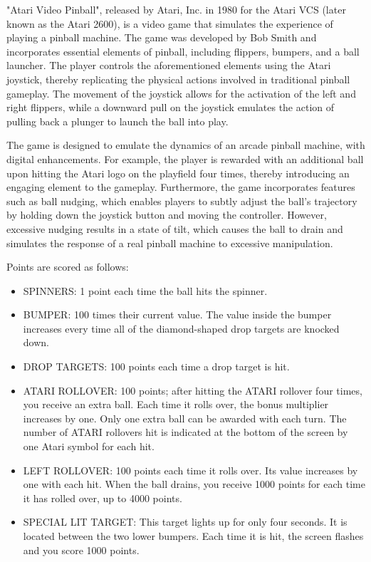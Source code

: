 "Atari Video Pinball", released by Atari, Inc. in 1980 for the Atari VCS (later known as the Atari 2600), is a video game that simulates the experience of playing a pinball machine. The game was developed by Bob Smith and incorporates essential elements of pinball, including flippers, bumpers, and a ball launcher. The player controls the aforementioned elements using the Atari joystick, thereby replicating the physical actions involved in traditional pinball gameplay. The movement of the joystick allows for the activation of the left and right flippers, while a downward pull on the joystick emulates the action of pulling back a plunger to launch the ball into play. \cite{newman2018atari}

The game is designed to emulate the dynamics of an arcade pinball machine, with digital enhancements. For example, the player is rewarded with an additional ball upon hitting the Atari logo on the playfield four times, thereby introducing an engaging element to the gameplay. Furthermore, the game incorporates features such as ball nudging, which enables players to subtly adjust the ball’s trajectory by holding down the joystick button and moving the controller. However, excessive nudging results in a state of tilt, which causes the ball to drain and simulates the response of a real pinball machine to excessive manipulation. \cite{newman2018atari}

Points are scored as follows: \cite{atari_videopinball}
\begin{itemize}
    \item SPINNERS: 1 point each time the ball hits the spinner.
    \item BUMPER: 100 times their current value. The value inside the bumper increases every time all of the diamond-shaped drop targets are knocked down.
    \item DROP TARGETS: 100 points each time a drop target is hit.
    \item ATARI ROLLOVER: 100 points; after hitting the ATARI rollover four times, you receive an extra ball. Each time it rolls over, the bonus multiplier increases by one. Only one extra ball can be awarded with each turn. The number of ATARI rollovers hit is indicated at the bottom of the screen by one Atari symbol for each hit.
    \item LEFT ROLLOVER: 100 points each time it rolls over. Its value increases by one with each hit. When the ball drains, you receive 1000 points for each time it has rolled over, up to 4000 points.
    \item SPECIAL LIT TARGET: This target lights up for only four seconds. It is located between the two lower bumpers. Each time it is hit, the screen flashes and you score 1000 points.
\end{itemize}

